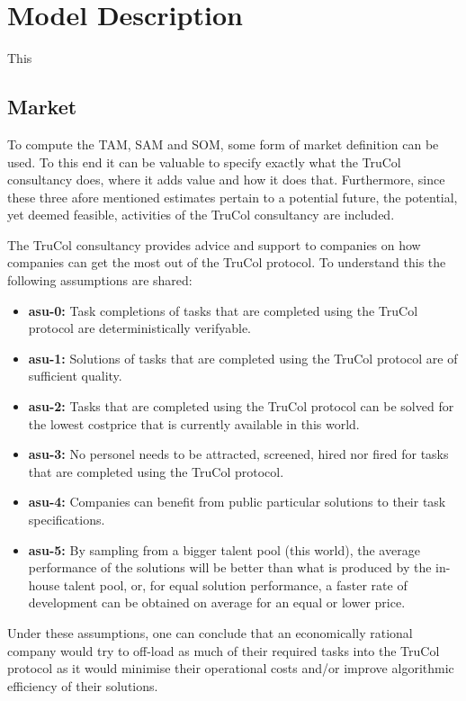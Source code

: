 \section{Model Description}\label{sec:model_description}
This


\subsection{Market}\label{subsec:model_description_market}
To compute the TAM, SAM and SOM, some form of market definition can be used. To this end it can be valuable to specify exactly what the TruCol consultancy does, where it adds value and how it does that. Furthermore, since these three afore mentioned estimates pertain to a potential future, the potential, yet deemed feasible, activities of the TruCol consultancy are included.

The TruCol consultancy provides advice and support to companies on how companies can get the most out of the TruCol protocol. To understand this the following assumptions are shared:

\begin{itemize}
	\item \textbf{asu-0:} Task completions of tasks that are completed using the TruCol protocol are deterministically verifyable.
	\item \textbf{asu-1:} Solutions of tasks that are completed using the TruCol protocol are of sufficient quality.
	\item \textbf{asu-2:} Tasks that are completed using the TruCol protocol can be solved for the lowest costprice that is currently available in this world.
	\item \textbf{asu-3:} No personel needs to be attracted, screened, hired nor fired for tasks that are completed using the TruCol protocol.
	\item \textbf{asu-4:} Companies can benefit from public particular solutions to their task specifications. 
	\item \textbf{asu-5:} By sampling from a bigger talent pool (this world), the average performance of the solutions will be better than what is produced by the in-house talent pool, or, for equal solution performance, a faster rate of development can be obtained on average for an equal or lower price.
\end{itemize}

Under these assumptions, one can conclude that an economically rational company would try to off-load as much of their required tasks into the TruCol protocol as it would minimise their operational costs and/or improve algorithmic efficiency of their solutions. 

